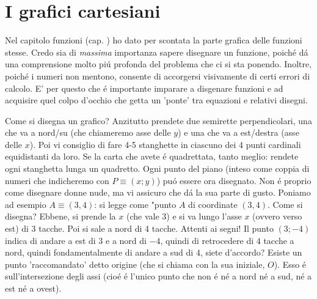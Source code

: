 \label{graficicartesiani} \section{I grafici cartesiani}

Nel capitolo funzioni (cap. ) ho dato per scontata la parte grafica delle funzioni stesse. Credo sia di {\em massima} importanza sapere disegnare un funzione, poich\'e d\'a una comprensione molto pi\'u profonda del problema che ci si sta ponendo. Inoltre, poich\'e i numeri non mentono, consente di accorgersi visivamente di certi errori di calcolo. E' per questo che \'e importante imparare a disgenare funzioni e ad acquisire quel colpo d'occhio che getta un 'ponte' tra equazioni e relativi disegni.

Come si disegna un grafico? Anzitutto prendete due semirette perpendicolari, una che va a nord/su (che chiameremo asse delle $y$)
e una che va a est/destra (asse delle $x$). Poi vi consiglio di fare 4-5 stanghette in ciascuno dei 4 punti cardinali equidistanti
da loro. Se la carta che avete \'e quadrettata, tanto meglio: rendete ogni stanghetta lunga un quadretto. Ogni punto del piano
(inteso come coppia di numeri che indicheremo con $P \equiv (x;y)$) pu\'o essere ora disegnato. Non \'e proprio come disegnare
donne nude, ma vi assicuro che d\'a la sua parte di gusto. Poniamo ad esempio $A \equiv (3,4)$: si legge come "punto $A$ di
coordinate $(3,4)$. Come si disegna? Ebbene, si prende la $x$ (che vale 3) e si va lungo l'asse $x$ (ovvero verso est) di 3 tacche.
Poi si sale a nord di 4 tacche. Attenti ai segni! Il punto $(3;-4)$ indica di andare a est di 3 e a nord di $-4$, quindi di
retrocedere di $4$ tacche a nord, quindi fondamentalmente di andare a sud di $4$, siete d'accordo? Esiste un punto 'raccomandato'
detto origine (che si chiama con la sua iniziale, $O$). Esso \'e sull'intersezione degli assi (cio\'e \'e l'unico punto che non
\'e n\'e a nord n\'e a sud, n\'e a est n\'e a ovest).


